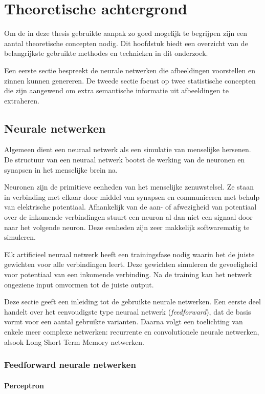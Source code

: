 \chapter{Theoretische achtergrond}
\label{hst-theorie}
Om de in deze thesis gebruikte aanpak zo goed mogelijk te begrijpen zijn een aantal theoretische concepten nodig. Dit hoofdstuk biedt een overzicht van de belangrijkste gebruikte methodes en technieken in dit onderzoek.

Een eerste sectie bespreekt de neurale netwerken die afbeeldingen voorstellen en zinnen kunnen genereren. De tweede sectie focust op twee statistische concepten die zijn aangewend om extra semantische informatie uit afbeeldingen te extraheren. 

\section{Neurale netwerken}
Algemeen dient een neuraal netwerk als een simulatie van menselijke hersenen. De structuur van een neuraal netwerk bootst de werking van de neuronen en synapsen in het menselijke brein na. 

Neuronen zijn de primitieve eenheden van het menselijke zenuwstelsel. Ze staan in verbinding met elkaar door middel van synapsen en communiceren met behulp van elektrische potentiaal. Afhankelijk van de aan- of afwezigheid van potentiaal over de inkomende verbindingen stuurt een neuron al dan niet een signaal door naar het volgende neuron. Deze eenheden zijn zeer makkelijk softwarematig te simuleren.

Elk artificieel neuraal netwerk heeft een trainingsfase nodig waarin het de juiste gewichten voor alle verbindingen leert. Deze gewichten simuleren de gevoeligheid voor potentiaal van een inkomende verbinding. Na de training kan het netwerk ongeziene input omvormen tot de juiste output.

Deze sectie geeft een inleiding tot de gebruikte neurale netwerken. Een eerste deel handelt over het eenvoudigste type neuraal netwerk (\emph{feedforward}), dat de basis vormt voor een aantal gebruikte varianten. Daarna volgt een toelichting van enkele meer complexe netwerken: recurrente en convolutionele neurale netwerken, alsook Long Short Term Memory netwerken.

\subsection{Feedforward neurale netwerken}
\subsubsection{Perceptron} %
\label{par:perceptron}

